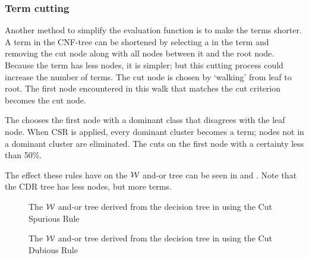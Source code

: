 \documentclass[twoside,11pt]{article}
\begin{document}
\subsubsection{Term cutting}
Another method to simplify the evaluation function is to make the terms shorter.  A term in the CNF-tree can be shortened by selecting a  in the term and removing the cut node along with all nodes between it and the root node.  Because the term has less nodes, it is simpler; but this cutting process could increase the number of terms. The cut node is chosen by `walking' from leaf to root.  The first node encountered in this walk that matches the cut criterion becomes the cut node. 

The  chooses the first node with a dominant class that disagrees with the leaf node. When CSR is applied, every dominant cluster becomes a term; nodes not in a dominant cluster are eliminated. The  cuts on the first node with a certainty less than 50\%.  

The effect these rules have on the ${\cal W}$ and-or tree can be seen in  and .  Note that the CDR tree has less nodes, but more terms.
\begin{figure} [ht]
\center
\tiny
{}
{
										{
										}
			{
				{
					{
						{ 
							{  }
						}
					}
				}
			}
}
\caption{The ${\cal W}$ and-or tree derived from the decision tree in  using the Cut Spurious Rule}
\label{fig:csr}
\end{figure}

\begin{figure} [!htb]
\center
\tiny
{}
{
								{
									{
										{
										}
									}
								}

	{
	}
}
\caption{The ${\cal W}$ and-or tree derived from the decision tree in  using the Cut Dubious Rule}
\label{fig:cdr}
\end{figure}
\end{document}

